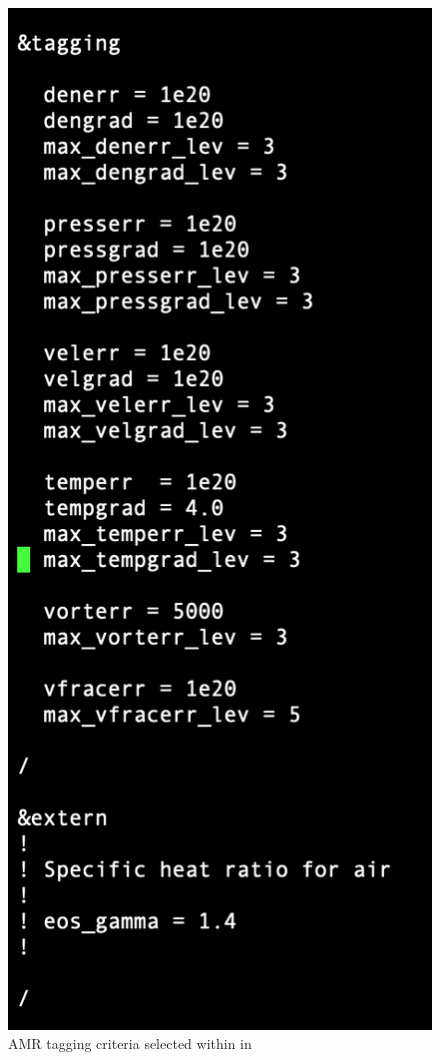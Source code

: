 \begin{figure}[H]
\begin{center}
\includegraphics[scale=0.5]{figures/tagging.png}
\end{center}
\caption{AMR tagging criteria selected within in }
\label{PeleC_tagging_fig}
\end{figure} 